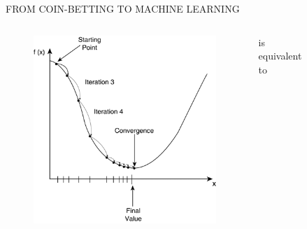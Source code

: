 \documentclass[final,t,serif,mathserif]{beamer}
\begin{document}
\begin{frame}{}
\begin{columns}[t]
\begin{column}{.33\linewidth}
\begin{block}{FROM COIN-BETTING TO MACHINE LEARNING}
    \begin{columns}[c]
	\begin{column}{7cm}
		\begin{figure}
			\includegraphics[width=\linewidth]{figs/gd}
		\end{figure}
	\end{column}
	\begin{column}{10cm}
		\center
		is equivalent to
	\end{column}
	\begin{column}{7cm}
		\begin{figure}

\end{figure}
\end{column}
\end{columns}
\end{block}
\end{column}
\end{columns}
\end{frame}
\end{document}
